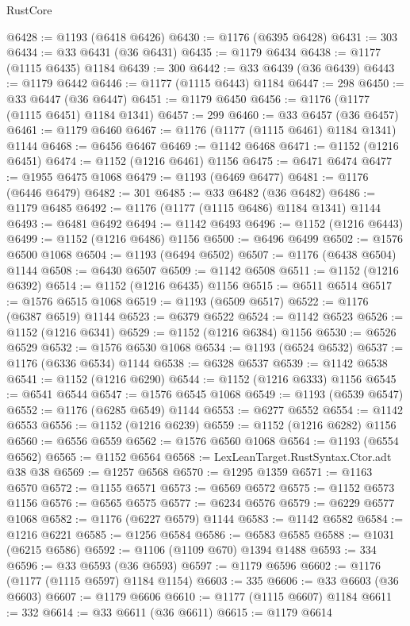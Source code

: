 \begin{lexlean}{RustCore}
\begin{coremodule}
@6428 := @1193 (@6418 @6426)
@6430 := @1176 (@6395 @6428)
@6431 := 303
@6434 := @33 @6431 (@36 @6431)
@6435 := @1179 @6434
@6438 := @1177 (@1115 @6435) @1184
@6439 := 300
@6442 := @33 @6439 (@36 @6439)
@6443 := @1179 @6442
@6446 := @1177 (@1115 @6443) @1184
@6447 := 298
@6450 := @33 @6447 (@36 @6447)
@6451 := @1179 @6450
@6456 := @1176 (@1177 (@1115 @6451) @1184 @1341)
@6457 := 299
@6460 := @33 @6457 (@36 @6457)
@6461 := @1179 @6460
@6467 := @1176 (@1177 (@1115 @6461) @1184 @1341) @1144
@6468 := @6456 @6467
@6469 := @1142 @6468
@6471 := @1152 (@1216 @6451)
@6474 := @1152 (@1216 @6461) @1156
@6475 := @6471 @6474
@6477 := @1955 @6475 @1068
@6479 := @1193 (@6469 @6477)
@6481 := @1176 (@6446 @6479)
@6482 := 301
@6485 := @33 @6482 (@36 @6482)
@6486 := @1179 @6485
@6492 := @1176 (@1177 (@1115 @6486) @1184 @1341) @1144
@6493 := @6481 @6492
@6494 := @1142 @6493
@6496 := @1152 (@1216 @6443)
@6499 := @1152 (@1216 @6486) @1156
@6500 := @6496 @6499
@6502 := @1576 @6500 @1068
@6504 := @1193 (@6494 @6502)
@6507 := @1176 (@6438 @6504) @1144
@6508 := @6430 @6507
@6509 := @1142 @6508
@6511 := @1152 (@1216 @6392)
@6514 := @1152 (@1216 @6435) @1156
@6515 := @6511 @6514
@6517 := @1576 @6515 @1068
@6519 := @1193 (@6509 @6517)
@6522 := @1176 (@6387 @6519) @1144
@6523 := @6379 @6522
@6524 := @1142 @6523
@6526 := @1152 (@1216 @6341)
@6529 := @1152 (@1216 @6384) @1156
@6530 := @6526 @6529
@6532 := @1576 @6530 @1068
@6534 := @1193 (@6524 @6532)
@6537 := @1176 (@6336 @6534) @1144
@6538 := @6328 @6537
@6539 := @1142 @6538
@6541 := @1152 (@1216 @6290)
@6544 := @1152 (@1216 @6333) @1156
@6545 := @6541 @6544
@6547 := @1576 @6545 @1068
@6549 := @1193 (@6539 @6547)
@6552 := @1176 (@6285 @6549) @1144
@6553 := @6277 @6552
@6554 := @1142 @6553
@6556 := @1152 (@1216 @6239)
@6559 := @1152 (@1216 @6282) @1156
@6560 := @6556 @6559
@6562 := @1576 @6560 @1068
@6564 := @1193 (@6554 @6562)
@6565 := @1152 @6564
@6568 := LexLeanTarget.RustSyntax.Ctor.adt @38 @38
@6569 := @1257 @6568
@6570 := @1295 @1359
@6571 := @1163 @6570
@6572 := @1155 @6571
@6573 := @6569 @6572
@6575 := @1152 @6573 @1156
@6576 := @6565 @6575
@6577 := @6234 @6576
@6579 := @6229 @6577 @1068
@6582 := @1176 (@6227 @6579) @1144
@6583 := @1142 @6582
@6584 := @1216 @6221
@6585 := @1256 @6584
@6586 := @6583 @6585
@6588 := @1031 (@6215 @6586)
@6592 := @1106 (@1109 @670) @1394 @1488
@6593 := 334
@6596 := @33 @6593 (@36 @6593)
@6597 := @1179 @6596
@6602 := @1176 (@1177 (@1115 @6597) @1184 @1154)
@6603 := 335
@6606 := @33 @6603 (@36 @6603)
@6607 := @1179 @6606
@6610 := @1177 (@1115 @6607) @1184
@6611 := 332
@6614 := @33 @6611 (@36 @6611)
@6615 := @1179 @6614

\end{coremodule}
\end{lexlean}
